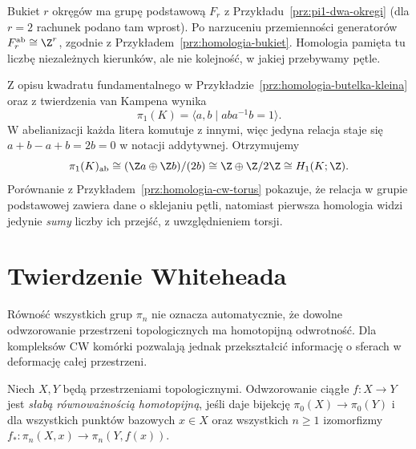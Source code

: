 \begin{przyklad}
Bukiet $r$ okręgów ma
grupę podstawową
$F_r$ z
Przykładu~\ref{prz:pi1-dwa-okregi}
(dla $r=2$ rachunek
podano tam wprost).
Po narzuceniu
przemienności generatorów
$F_r^{\mathrm{ab}}\cong\Z^r$,
zgodnie z
Przykładem~\ref{prz:homologia-bukiet}.
Homologia pamięta tu
liczbę niezależnych
kierunków, ale nie
kolejność, w jakiej
przebywamy pętle.
\end{przyklad}

\begin{przyklad}
\label{prz:pi1-klein-hurewicz}
Z opisu kwadratu fundamentalnego w
Przykładzie~\ref{prz:homologia-butelka-kleina}
oraz z twierdzenia van Kampena wynika
\[
 \pi_1(K)=\langle a,b\mid aba^{-1}b=1\rangle.
\]
W abelianizacji każda litera komutuje z innymi,
więc jedyna relacja staje się
$a+b-a+b=2b=0$ w notacji addytywnej.
Otrzymujemy
\[
 \pi_1(K)_{\mathrm{ab}}
 \cong (\Z a\oplus\Z b)/(2b)
 \cong\Z\oplus\Z/2\Z
 \cong H_1(K;\Z).
\]
Porównanie z
Przykładem~\ref{prz:homologia-cw-torus}
pokazuje, że relacja w grupie podstawowej
zawiera dane o sklejaniu pętli, natomiast
pierwsza homologia widzi jedynie \emph{sumy}
liczby ich przejść, z uwzględnieniem torsji.
\end{przyklad}

\section{Twierdzenie Whiteheada}
\label{sec:whitehead}

Równość wszystkich grup $\pi_n$
nie oznacza automatycznie, że
dowolne odwzorowanie przestrzeni
topologicznych ma homotopijną
odwrotność. Dla kompleksów CW
komórki pozwalają jednak
przekształcić informację
o sferach w deformację
całej przestrzeni.

\begin{definicja}
\label{def:slaba-rownowaznosc}
Niech $X,Y$ będą przestrzeniami topologicznymi.
Odwzorowanie ciągłe $f:X\to Y$ jest
\emph{słabą równoważnością
homotopijną}, jeśli daje
bijekcję $\pi_0(X)\to\pi_0(Y)$
i dla wszystkich punktów
bazowych $x\in X$ oraz
wszystkich $n\geq1$
izomorfizmy
$f_*:\pi_n(X,x)\to
\pi_n(Y,f(x))$.
\end{definicja}

